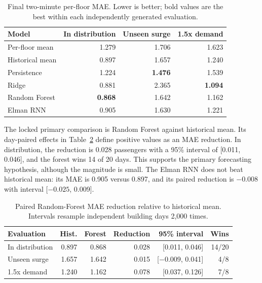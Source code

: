 \documentclass[12pt]{article}
\begin{document}
\begin{table}[H]
  \centering
  \caption{Final two-minute per-floor MAE. Lower is better; bold values are the
  best within each independently generated evaluation.}
  \label{tab:final-forecast-all}
  \begin{tabular}{@{}lrrr@{}}
    \toprule
    Model & In distribution & Unseen surge & 1.5x demand \\
    \midrule
    Per-floor mean & 1.279 & 1.706 & 1.623 \\
    Historical mean & 0.897 & 1.657 & 1.240 \\
    Persistence & 1.224 & \textbf{1.476} & 1.539 \\
    Ridge & 0.881 & 2.365 & \textbf{1.094} \\
    Random Forest & \textbf{0.868} & 1.642 & 1.162 \\
    Elman RNN & 0.905 & 1.630 & 1.221 \\
    \bottomrule
  \end{tabular}
\end{table}

The locked primary comparison is Random Forest against historical mean. Its
day-paired effects in Table~\ref{tab:final-forecast-effects} define positive
values as an MAE reduction. In distribution, the reduction is 0.028 passengers
with a 95\% interval of [0.011, 0.046], and the forest wins 14 of 20 days. This
supports the primary forecasting hypothesis, although the magnitude is small.
The Elman RNN does not beat historical mean: its MAE is 0.905 versus 0.897, and
its paired reduction is $-0.008$ with interval [$-0.025$, 0.009].

\begin{table}[H]
  \centering
  \caption{Paired Random-Forest MAE reduction relative to historical mean.
  Intervals resample independent building days 2,000 times.}
  \label{tab:final-forecast-effects}
  \begin{tabular}{@{}lrrrrr@{}}
    \toprule
    Evaluation & Hist. & Forest & Reduction & 95\% interval & Wins \\
    \midrule
    In distribution & 0.897 & 0.868 & 0.028 & [0.011, 0.046] & 14/20 \\
    Unseen surge & 1.657 & 1.642 & 0.015 & [$-0.009$, 0.041] & 4/8 \\
    1.5x demand & 1.240 & 1.162 & 0.078 & [0.037, 0.126] & 7/8 \\
    \bottomrule
  \end{tabular}
\end{table}
\end{document}
